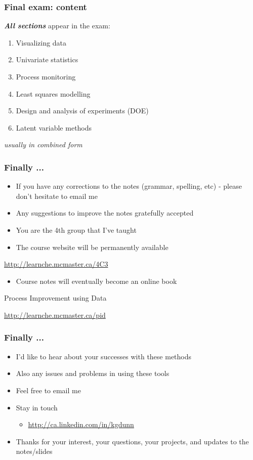 \begin{frame}\frametitle{Final exam: content}
	
	\textbf{\emph{All sections}} appear in the exam:
	\begin{enumerate}
		\item	Visualizing data 
		\item	Univariate statistics 
		\item	Process monitoring 
		\item	Least squares modelling 
		\item	Design and analysis of experiments (DOE) 
		\item	Latent variable methods 
	\end{enumerate}
	\emph{usually in combined form}
\end{frame}

\begin{frame}\frametitle{Finally ...}
	\begin{itemize}
		\item	If you have any corrections to the notes (grammar, spelling, etc) - please don't hesitate to email me 
		\item	Any suggestions to improve the notes gratefully accepted 
		\item	You are the 4th group that I've taught
		\item	The course website will be permanently available 
	\end{itemize}
	\begin{block}{}
		\href{http://learnche.mcmaster.ca/4C3}{http://learnche.mcmaster.ca/4C3}
	\end{block}

	\begin{itemize}
		\item	Course notes will eventually become an online book 
	\end{itemize}
	\begin{block}
		{Process Improvement using Data} 
		\begin{center}
			\href{http://learnche.mcmaster.ca/pid}{http://learnche.mcmaster.ca/pid} 
		\end{center}
	\end{block}
\end{frame}

\begin{frame}\frametitle{Finally ...}
	\begin{itemize}
		\item	I'd like to hear about your successes with these methods 
		\item	Also any issues and problems in using these tools 
		\item	Feel free to email me
		\item	Stay in touch
		\begin{itemize}
			\item	\href{http://ca.linkedin.com/in/kgdunn}{http://ca.linkedin.com/in/kgdunn}
		\end{itemize}
		\item	Thanks for your interest, your questions, your projects, and updates to the notes/slides
	\end{itemize}
\end{frame}
